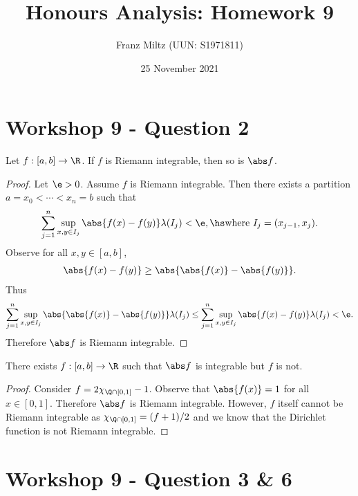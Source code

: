 \documentclass{article}
\begin{document}
\title{Honours Analysis: Homework 9}
\author{Franz Miltz (UUN: S1971811)}
\date{25 November 2021}
\maketitle

\section*{Workshop 9 - Question 2}

\begin{claim*}
   Let $f:[a,b]\to\R$. If $f$ is Riemann integrable, then so is $\abs f$.
\end{claim*}
\begin{proof}
   Let $\e>0$. Assume $f$ is Riemann integrable. Then there exists a partition
   $a=x_0<\cdots<x_n=b$ such that
   \begin{align*}
      \sum_{j=1}^n \sup_{x,y\in I_j} \abs{f(x) - f(y)} \lambda(I_j) < \e,\hs
      \text{where }I_j = (x_{j-1}, x_j).
   \end{align*}
   Observe for all $x,y\in[a,b]$,
   \begin{align*}
      \abs{f(x)-f(y)} \geq \abs{\abs{f(x)} - \abs{f(y)}}.
   \end{align*}
   Thus
   \begin{align*}
      \sum_{j=1}^n \sup_{x,y\in I_j} \abs{\abs{f(x)} - \abs{f(y)}} \lambda(I_j)
      \leq \sum_{j=1}^n \sup_{x,y\in I_j} \abs{f(x) - f(y)} \lambda(I_j) < \e.
   \end{align*}
   Therefore $\abs f$ is Riemann integrable.
\end{proof}

\begin{claim*}
   There exists $f:[a,b]\to\R$ such that $\abs f$ is integrable but $f$ is not.
\end{claim*}
\begin{proof}
   Consider $f = 2\chi_{\Q\cap[0,1]}-1$. Observe that $\abs{f(x)} = 1$ for all $x\in[0,1]$.
   Therefore $\abs f$ is Riemann integrable. However, $f$ itself cannot be Riemann integrable
   as $\chi_{\Q\cap[0,1]} = (f+1)/2$ and we know that the Dirichlet function is not Riemann
   integrable.
\end{proof}

\section*{Workshop 9 - Question 3 \& 6}
\end{document}
